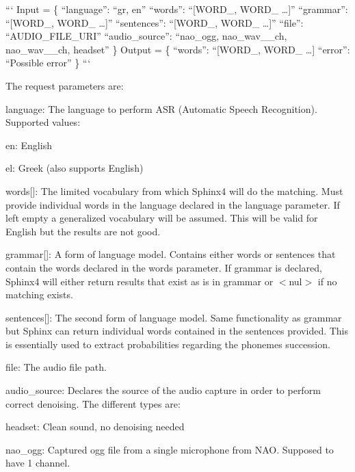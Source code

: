 ``` Input = \{ “language”\-: “gr, en” “words”\-: “\mbox{[}W\-O\-R\-D\-\_, W\-O\-R\-D\-\_ …\mbox{]}” “grammar”\-: “\mbox{[}W\-O\-R\-D\-\_, W\-O\-R\-D\-\_ …\mbox{]}” “sentences”\-: “\mbox{[}W\-O\-R\-D\-\_, W\-O\-R\-D\-\_ …\mbox{]}” “file”\-: “\-A\-U\-D\-I\-O\-\_\-\-F\-I\-L\-E\-\_\-\-U\-R\-I” “audio\-\_\-source”\-: “nao\-\_\-ogg, nao\-\_\-wav\-\_\-\_\-ch, nao\-\_\-wav\-\_\-\_\-ch, headset” \} {\ttfamily  } Output = \{ “words”\-: “\mbox{[}W\-O\-R\-D\-\_, W\-O\-R\-D\-\_ …\mbox{]} “error”\-: “\-Possible error” \} ```

The request parameters are\-:


\begin{DoxyItemize}
\item {\ttfamily language}\-: The language to perform A\-S\-R (Automatic Speech Recognition). Supported values\-:
\begin{DoxyItemize}
\item {\ttfamily en}\-: English
\item {\ttfamily el}\-: Greek (also supports English)
\end{DoxyItemize}
\item {\ttfamily words\mbox{[}\mbox{]}}\-: The limited vocabulary from which Sphinx4 will do the matching. Must provide individual words in the language declared in the language parameter. If left empty a generalized vocabulary will be assumed. This will be valid for English but the results are not good.
\item {\ttfamily grammar\mbox{[}\mbox{]}}\-: A form of language model. Contains either words or sentences that contain the words declared in the words parameter. If grammar is declared, Sphinx4 will either return results that exist as is in grammar or $<$nul$>$ if no matching exists.
\item {\ttfamily sentences\mbox{[}\mbox{]}}\-: The second form of language model. Same functionality as grammar but Sphinx can return individual words contained in the sentences provided. This is essentially used to extract probabilities regarding the phonemes succession.
\item {\ttfamily file}\-: The audio file path.
\item {\ttfamily audio\-\_\-source}\-: Declares the source of the audio capture in order to perform correct denoising. The different types are\-:
\begin{DoxyItemize}
\item headset\-: Clean sound, no denoising needed
\item nao\-\_\-ogg\-: Captured ogg file from a single microphone from N\-A\-O. Supposed to have 1 channel.

\end{DoxyItemize}
\end{DoxyItemize}
